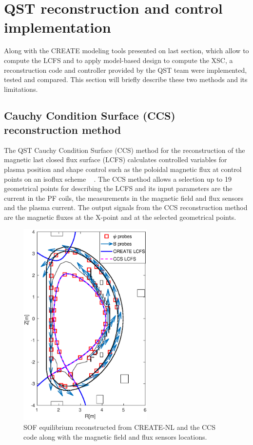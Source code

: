 \section{QST reconstruction and control implementation}
Along with the CREATE modeling tools presented on last section, which allow to compute the LCFS and to apply model-based design to compute the XSC, a reconstruction code and controller provided by the QST team were implemented, tested and compared. This section will briefly describe these two methods and its limitations.  

\subsection{Cauchy Condition Surface (CCS) reconstruction  method }
The QST Cauchy Condition Surface (CCS) method for the reconstruction of the magnetic last closed flux surface (LCFS) calculates controlled variables for plasma position and shape control such as the poloidal magnetic flux at control points on an isoflux scheme  ~\cite{CCS} . The CCS method allows a selection up to 19 geometrical points for describing the LCFS and its input parameters are the current in the PF coils, the measurements in the magnetic field and flux sensors and the plasma current. The output signals from the CCS reconstruction method are the magnetic fluxes at the X-point and at the selected geometrical points. 

\begin{figure}
	\centering
	\includegraphics[width=0.6\textwidth]{Chp3/sensors_plots_newDirection.eps}
	\caption{SOF equilibrium reconstructed from CREATE-NL and the CCS code along with the  magnetic field and flux sensors locations.	\label{JT60sensors} }
\end{figure}


